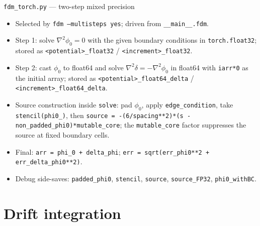 \documentclass[10pt,aspectratio=169]{beamer}
\newcommand{\ti}[1]{\texttt{\footnotesize #1}}
\begin{document}
\begin{frame}{\texttt{fdm\_torch.py} --- two-step mixed precision}
  \begin{itemize}\small
  \item Selected by \ti{fdm --multisteps yes}; driven from \ti{\_\_main\_\_.fdm}.
  \item Step 1: solve $\nabla^2\phi_0=0$ with the given boundary conditions in
        \ti{torch.float32}; stored as \ti{<potential>\_float32} / \ti{<increment>\_float32}.
  \item Step 2: cast $\phi_0$ to float64 and solve
        $\nabla^2\delta=-\nabla^2\phi_0$ in float64 with \ti{iarr*0} as the initial array;
        stored as \ti{<potential>\_float64\_delta} / \ti{<increment>\_float64\_delta}.
  \item Source construction inside \ti{solve}: pad $\phi_0$, apply \ti{edge\_condition},
        take \ti{stencil(phi0\_)}, then
        \ti{source = -(6/spacing**2)*(s - non\_padded\_phi0)*mutable\_core}; the
        \ti{mutable\_core} factor suppresses the source at fixed boundary cells.
  \item Final: \ti{arr = phi\_0 + delta\_phi}; \ti{err = sqrt(err\_phi0**2 +
        err\_delta\_phi0**2)}.
  \item Debug side-saves: \ti{padded\_phi0}, \ti{stencil}, \ti{source}, \ti{source\_FP32},
        \ti{phi0\_withBC}.
  \end{itemize}
\end{frame}

\section{Drift integration}
\end{document}
